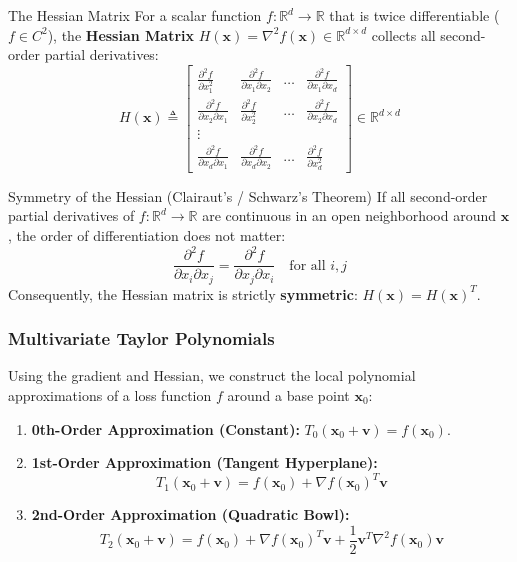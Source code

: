 \begin{definitionbox}{The Hessian Matrix}
For a scalar function $f: \mathbb{R}^d \to \mathbb{R}$ that is twice differentiable ($f \in C^2$), the \textbf{Hessian Matrix} $H(\mathbf{x}) = \nabla^2 f(\mathbf{x}) \in \mathbb{R}^{d \times d}$ collects all second-order partial derivatives:
\begin{equation}
H(\mathbf{x}) \triangleq \begin{bmatrix}
\frac{\partial^2 f}{\partial x_1^2} & \frac{\partial^2 f}{\partial x_1 \partial x_2} & \dots & \frac{\partial^2 f}{\partial x_1 \partial x_d} \\
\frac{\partial^2 f}{\partial x_2 \partial x_1} & \frac{\partial^2 f}{\partial x_2^2} & \dots & \frac{\partial^2 f}{\partial x_2 \partial x_d} \\
\vdots \\
\frac{\partial^2 f}{\partial x_d \partial x_1} & \frac{\partial^2 f}{\partial x_d \partial x_2} & \dots & \frac{\partial^2 f}{\partial x_d^2}
\end{bmatrix} \in \mathbb{R}^{d \times d}
\label{eq:hessian_def}
\end{equation}
\end{definitionbox}

\begin{theorembox}{Symmetry of the Hessian (Clairaut's / Schwarz's Theorem)}
If all second-order partial derivatives of $f: \mathbb{R}^d \to \mathbb{R}$ are continuous in an open neighborhood around $\mathbf{x}$, the order of differentiation does not matter:
\begin{equation}
\frac{\partial^2 f}{\partial x_i \partial x_j} = \frac{\partial^2 f}{\partial x_j \partial x_i} \quad \text{for all } i, j
\end{equation}
Consequently, the Hessian matrix is strictly \textbf{symmetric}: $H(\mathbf{x}) = H(\mathbf{x})^T$.
\end{theorembox}

\subsubsection{Multivariate Taylor Polynomials}
Using the gradient and Hessian, we construct the local polynomial approximations of a loss function $f$ around a base point $\mathbf{x}_0$:
\begin{enumerate}
    \item \textbf{0th-Order Approximation (Constant):} $T_0(\mathbf{x}_0 + \mathbf{v}) = f(\mathbf{x}_0)$.
    \item \textbf{1st-Order Approximation (Tangent Hyperplane):}
    \begin{equation}
    T_1(\mathbf{x}_0 + \mathbf{v}) = f(\mathbf{x}_0) + \nabla f(\mathbf{x}_0)^T \mathbf{v}
    \end{equation}
    \item \textbf{2nd-Order Approximation (Quadratic Bowl):}
    \begin{equation}
    T_2(\mathbf{x}_0 + \mathbf{v}) = f(\mathbf{x}_0) + \nabla f(\mathbf{x}_0)^T \mathbf{v} + \frac{1}{2} \mathbf{v}^T \nabla^2 f(\mathbf{x}_0) \mathbf{v}
    \label{eq:second_order_taylor}
    \end{equation}
\end{enumerate}

